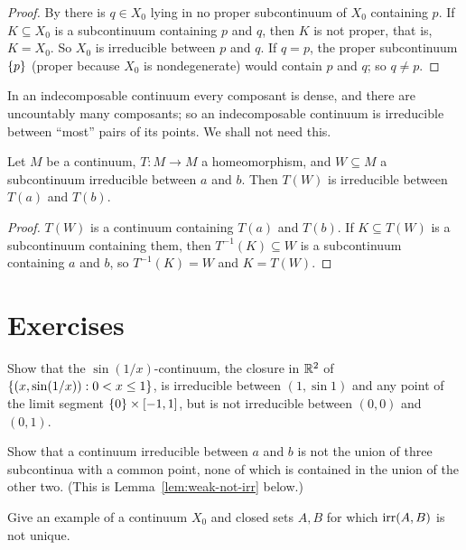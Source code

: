 \begin{proof}
By  there is $q\in X_0$ lying in no proper subcontinuum of $X_0$ containing $p$.
If $K\subseteq X_0$ is a subcontinuum containing $p$ and $q$, then $K$ is not proper, that is,
$K=X_0$. So $X_0$ is irreducible between $p$ and $q$. If $q=p$, the proper subcontinuum $\left\{ p \right\}$
(proper because $X_0$ is nondegenerate) would contain $p$ and $q$; so $q\neq p$.
\end{proof}


\begin{remark}
In an indecomposable continuum every composant is dense, and there are uncountably many
composants; so an indecomposable continuum is irreducible between ``most'' pairs of its points.
We shall not need this.
\end{remark}

\begin{proposition}\label{prop:irr-homeo}
Let $M$ be a continuum, $T\colon M\to M$ a homeomorphism, and $W\subseteq M$ a subcontinuum
irreducible between $a$ and $b$. Then $T(W)$ is irreducible between $T(a)$ and $T(b)$.
\end{proposition}

\begin{proof}
$T(W)$ is a continuum containing $T(a)$ and $T(b)$. If $K\subseteq T(W)$ is a subcontinuum containing
them, then $T^{-1}(K)\subseteq W$ is a subcontinuum containing $a$ and $b$, so $T^{-1}(K)=W$ and
$K=T(W)$.
\end{proof}


\section*{Exercises}

\begin{exercise}
Show that the $\sin(1/x)$-continuum, the closure in $\mathbb{R}^2$ of $\left\{ (x,\sin(1/x)):0<x\le1 \right\}$, is
irreducible between $(1,\sin1)$ and any point of the limit segment $\left\{ 0 \right\}\times[-1,1]$, but is not
irreducible between $(0,0)$ and $(0,1)$.
\end{exercise}

\begin{exercise}
Show that a continuum irreducible between $a$ and $b$ is not the union of three subcontinua with a
common point, none of which is contained in the union of the other two. (This is
Lemma~\ref{lem:weak-not-irr} below.)
\end{exercise}

\begin{exercise}
Give an example of a continuum $X_0$ and closed sets $A,B$ for which $\operatorname{irr}(A,B)$ is not unique.
\end{exercise}
